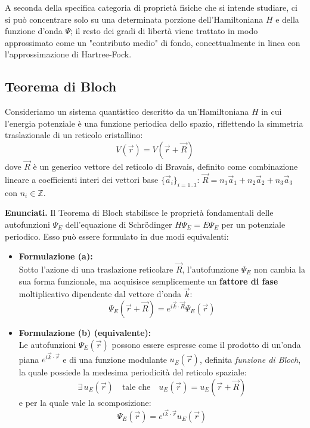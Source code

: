 A seconda della specifica categoria di proprietà fisiche che si intende studiare, ci si può concentrare solo su una determinata porzione dell'Hamiltoniana \( H \) e della funzione d'onda \( \Psi \); il resto dei gradi di libertà viene trattato in modo approssimato come un "contributo medio" di fondo, concettualmente in linea con l'approssimazione di Hartree-Fock.

\subsection{Teorema di Bloch}


Consideriamo un sistema quantistico descritto da un'Hamiltoniana \(H\) in cui l'energia potenziale è una funzione periodica dello spazio, riflettendo la simmetria traslazionale di un reticolo cristallino:
\begin{equation}
    V(\vec{r}) = V(\vec{r} + \vec{R})
\end{equation}
dove \(\vec{R}\) è un generico vettore del reticolo di Bravais, definito come combinazione lineare a coefficienti interi dei vettori base \(\{\vec{a}_i\}_{i=1..3}\): \(\vec{R} = n_1\vec{a}_1 + n_2\vec{a}_2 + n_3\vec{a}_3\) con \(n_i \in \mathbb{Z}\).

\textbf{Enunciati.} Il Teorema di Bloch stabilisce le proprietà fondamentali delle autofunzioni \(\Psi_E\) dell'equazione di Schrödinger \(H\Psi_E = E\Psi_E\) per un potenziale periodico. Esso può essere formulato in due modi equivalenti:

\begin{itemize}
    \item \textbf{Formulazione (a):} \\
    Sotto l'azione di una traslazione reticolare \(\vec{R}\), l'autofunzione \(\Psi_E\) non cambia la sua forma funzionale, ma acquisisce semplicemente un \textbf{fattore di fase} moltiplicativo dipendente dal vettore d'onda \(\vec{k}\):
    \begin{equation}
        \Psi_E(\vec{r} + \vec{R}) = e^{i\vec{k}\cdot\vec{R}} \Psi_E(\vec{r})
    \end{equation}

    \item \textbf{Formulazione (b) (equivalente):} \\
    Le autofunzioni \(\Psi_E(\vec{r})\) possono essere espresse come il prodotto di un'onda piana \(e^{i\vec{k}\cdot\vec{r}}\) e di una funzione modulante \(u_E(\vec{r})\), definita \textit{funzione di Bloch}, la quale possiede la medesima periodicità del reticolo spaziale:
    \begin{equation}
        \exists \, u_E(\vec{r}) \quad \text{tale che} \quad u_E(\vec{r}) = u_E(\vec{r} + \vec{R})
    \end{equation}
    e per la quale vale la scomposizione:
    \begin{equation}
        \Psi_E(\vec{r}) = e^{i\vec{k}\cdot\vec{r}} u_E(\vec{r})
    \end{equation}
\end{itemize}

